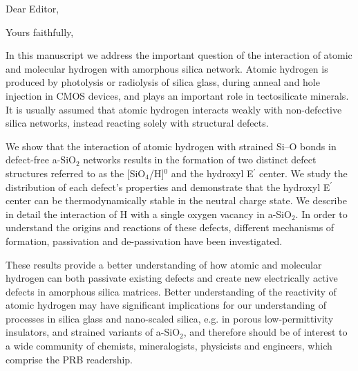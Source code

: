 \documentclass[10pt,a4paper,]{moderncv}        %
\begin{document}
\date{2$^{\textrm{nd}}$ April, 2015}
\opening{Dear Editor,} 
\closing{Yours faithfully,}
\makelettertitle

In this manuscript we address the important question of the interaction of atomic and molecular hydrogen with amorphous silica network. Atomic hydrogen is produced by photolysis or radiolysis of silica glass, during anneal and hole injection in CMOS devices, and plays an important role in tectosilicate minerals. It is usually assumed that atomic hydrogen interacts weakly with non-defective silica networks, instead reacting solely with structural defects. 

We show that the interaction of atomic hydrogen with strained \mbox{Si--O} bonds in defect-free a-SiO$_2$ networks results in the formation of two distinct defect structures referred to as the [SiO$_4$/H]$^0$ and the hydroxyl E$^\prime$ center. We study the distribution of each defect's properties and demonstrate that the hydroxyl E$^\prime$ center can be thermodynamically stable in the neutral charge state. We describe in detail the interaction of H with a single oxygen vacancy in a-SiO$_2$. In order to understand the origins and reactions of these defects, different mechanisms of formation, passivation and de-passivation have been investigated. 

These results provide a better understanding of how atomic and molecular hydrogen can both passivate existing defects and create new electrically active defects in amorphous silica matrices. Better understanding of the reactivity of atomic hydrogen may have significant implications for our understanding of processes in silica glass and nano-scaled silica, e.g. in porous low-permittivity insulators, and strained variants of a-SiO$_2$, and therefore should be of interest to a wide community of chemists, mineralogists, physicists and engineers, which comprise the PRB readership.

\makeletterclosing
%
%
%
%
\end{document}
